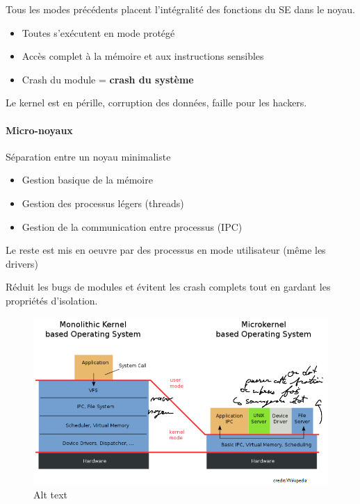 Tous les modes précédents placent l'intégralité des fonctions du SE dans
le noyau.

\begin{itemize}
\tightlist
\item
  Toutes s'exécutent en mode protégé
\item
  Accès complet à la mémoire et aux instructions sensibles
\item
  Crash du module = \textbf{crash du système}
\end{itemize}

Le kernel est en pérille, corruption des données, faille pour les
hackers.

\paragraph{Micro-noyaux}\label{micro-noyaux}

Séparation entre un noyau minimaliste

\begin{itemize}
\tightlist
\item
  Gestion basique de la mémoire
\item
  Gestion des processus légers (threads)
\item
  Gestion de la communication entre processus (IPC)
\end{itemize}

Le reste est mis en oeuvre par des processus en mode utilisateur (même
les drivers)

Réduit les bugs de modules et évitent les crash complets tout en gardant
les propriétés d'isolation.

\begin{figure}
\centering
\includegraphics{image-21.png}
\caption{Alt text}
\end{figure}

